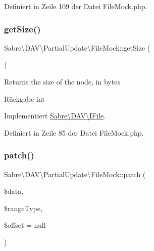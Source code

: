 Definiert in Zeile 109 der Datei File\+Mock.\+php.

\mbox{\label{class_sabre_1_1_d_a_v_1_1_partial_update_1_1_file_mock_aba348d3355af18e1b1bd8e54674e07f5}} 
\subsubsection{\texorpdfstring{get\+Size()}{getSize()}}
{\footnotesize\ttfamily Sabre\textbackslash{}\+D\+A\+V\textbackslash{}\+Partial\+Update\textbackslash{}\+File\+Mock\+::get\+Size (\begin{DoxyParamCaption}{ }\end{DoxyParamCaption})}

Returns the size of the node, in bytes

\begin{DoxyReturn}{Rückgabe}
int 
\end{DoxyReturn}


Implementiert \mbox{\hyperlink{interface_sabre_1_1_d_a_v_1_1_i_file_aa1534e00805f45d9282de9c699dbe178}{Sabre\textbackslash{}\+D\+A\+V\textbackslash{}\+I\+File}}.



Definiert in Zeile 85 der Datei File\+Mock.\+php.

\mbox{\label{class_sabre_1_1_d_a_v_1_1_partial_update_1_1_file_mock_a93dea351066cf42f5e0e810ffa4f9b31}} 
\subsubsection{\texorpdfstring{patch()}{patch()}}
{\footnotesize\ttfamily Sabre\textbackslash{}\+D\+A\+V\textbackslash{}\+Partial\+Update\textbackslash{}\+File\+Mock\+::patch (\begin{DoxyParamCaption}\item[{}]{\$data,  }\item[{}]{\$range\+Type,  }\item[{}]{\$offset = {\ttfamily null} }\end{DoxyParamCaption})}

